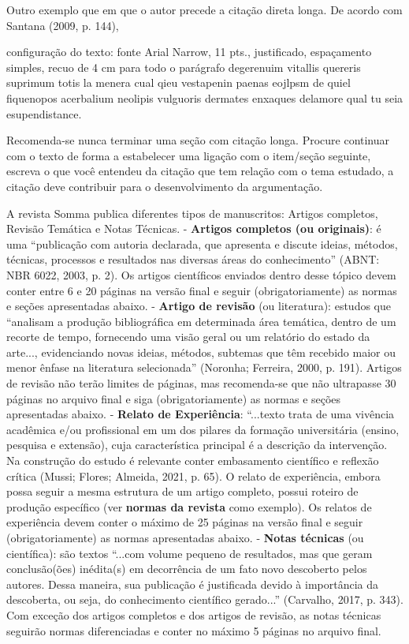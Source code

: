 Outro exemplo que em que o autor precede a citação direta longa. De acordo com Santana (2009, p. 144),
\begin{citacao}
configuração do texto: fonte Arial Narrow, 11 pts., justificado, espaçamento simples, recuo de 4 cm para todo o parágrafo degerenuim vitallis quereris suprimum totis la menera cual qieu vestapenin paenas eojlpsm de quiel fiquenopos acerbalium neolipis vulguoris dermates enxaques delamore qual tu seia esupendistance.
\end{citacao}

Recomenda-se nunca terminar uma seção com citação longa. Procure continuar com o texto de forma a estabelecer uma ligação com o item/seção seguinte, escreva o que você entendeu da citação que tem relação com o tema estudado, a citação deve contribuir para o desenvolvimento da argumentação.

A revista Somma publica diferentes tipos de manuscritos: Artigos completos, Revisão Temática e Notas Técnicas.
- \textbf{Artigos completos (ou originais)}: é uma ``publicação com autoria declarada, que apresenta e discute ideias, métodos, técnicas, processos e resultados nas diversas áreas do conhecimento'' (ABNT: NBR 6022, 2003, p. 2). Os artigos científicos enviados dentro desse tópico devem conter entre 6 e 20 páginas na versão final e seguir (obrigatoriamente) as normas e seções apresentadas abaixo.
- \textbf{Artigo de revisão} (ou literatura): estudos que ``analisam a produção bibliográfica em determinada área temática, dentro de um recorte de tempo, fornecendo uma visão geral ou um relatório do estado da arte..., evidenciando novas ideias, métodos, subtemas que têm recebido maior ou menor ênfase na literatura selecionada'' (Noronha; Ferreira, 2000, p. 191). Artigos de revisão não terão limites de páginas, mas recomenda-se que não ultrapasse 30 páginas no arquivo final e siga (obrigatoriamente) as normas e seções apresentadas abaixo.
- \textbf{Relato de Experiência}: ``...texto trata de uma vivência acadêmica e/ou profissional em um dos pilares da formação universitária (ensino, pesquisa e extensão), cuja característica principal é a descrição da intervenção. Na construção do estudo é relevante conter embasamento científico e reflexão crítica (Mussi; Flores; Almeida, 2021, p. 65). O relato de experiência, embora possa seguir a mesma estrutura de um artigo completo, possui roteiro de produção específico (ver \textbf{normas da revista} como exemplo). Os relatos de experiência devem conter o máximo de 25 páginas na versão final e seguir (obrigatoriamente) as normas apresentadas abaixo.
- \textbf{Notas técnicas} (ou científica): são textos ``...com volume pequeno de resultados, mas que geram conclusão(ões) inédita(s) em decorrência de um fato novo descoberto pelos autores. Dessa maneira, sua publicação é justificada devido à importância da descoberta, ou seja, do conhecimento científico gerado...'' (Carvalho, 2017, p. 343). Com exceção dos artigos completos e dos artigos de revisão, as notas técnicas seguirão normas diferenciadas e conter no máximo 5 páginas no arquivo final.

